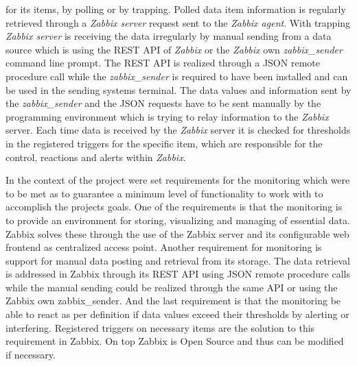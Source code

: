 for its items, by polling or by trapping. Polled data item information is regularly retrieved through a \textit{Zabbix server} request sent to the \textit{Zabbix agent}. With trapping \textit{Zabbix server} is receiving the data irregularly by manual sending from a data source which is using the REST API of \textit{Zabbix} or the \textit{Zabbix} own \textit{zabbix\_sender} command line prompt. The REST API is realized through a JSON remote procedure call while the \textit{zabbix\_sender} is required to have been installed and can be used in the sending systems terminal. The data values and information sent by the \textit{zabbix\_sender} and the JSON requests have to be sent manually by the programming environment which is trying to relay information to the \textit{Zabbix} server. Each time data is received by the \textit{Zabbix} server it is checked for thresholds in the registered triggers for the specific item, which are responsible for the control, reactions and alerts within \textit{Zabbix}.\cite{zab2, zab3}
	
	In the context of the project were set requirements for the monitoring which were to be met as to guarantee a minimum level of functionality to work with to accomplish the projects goals. One of the requirements is that the monitoring is to provide an environment for storing, visualizing and managing of essential data. Zabbix solves these through the use of the Zabbix server and its configurable web frontend as centralized access point. Another requirement for monitoring is support for manual data posting and retrieval from its storage. The data retrieval is addressed in Zabbix through its REST API using JSON remote procedure calls while the manual sending could be realized through the same API or using the Zabbix own zabbix\_sender. And the last requirement is that the monitoring be able to react as per definition if data values exceed their thresholds by alerting or interfering. Registered triggers on necessary items are the solution to this requirement in Zabbix. On top Zabbix is Open Source and thus can be modified if necessary.
